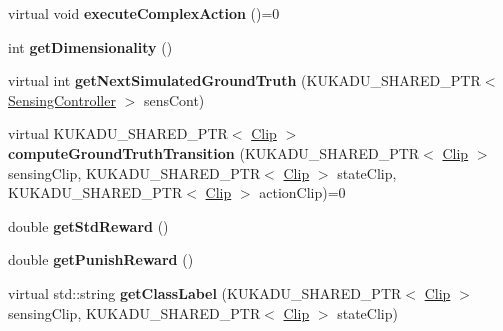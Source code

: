 \begin{DoxyCompactItemize}
\item 
\hypertarget{classkukadu_1_1ComplexController_a246a72860c5c317173d1f212ac7a25b3}{virtual void {\bfseries execute\-Complex\-Action} ()=0}\label{classkukadu_1_1ComplexController_a246a72860c5c317173d1f212ac7a25b3}

\item 
\hypertarget{classkukadu_1_1ComplexController_abc9b91acb5e94cbc6a4edd1ba3a38583}{int {\bfseries get\-Dimensionality} ()}\label{classkukadu_1_1ComplexController_abc9b91acb5e94cbc6a4edd1ba3a38583}

\item 
\hypertarget{classkukadu_1_1ComplexController_a1b272529d7f87ba1bfe9fde5e99f98de}{virtual int {\bfseries get\-Next\-Simulated\-Ground\-Truth} (K\-U\-K\-A\-D\-U\-\_\-\-S\-H\-A\-R\-E\-D\-\_\-\-P\-T\-R$<$ \hyperlink{classkukadu_1_1SensingController}{Sensing\-Controller} $>$ sens\-Cont)}\label{classkukadu_1_1ComplexController_a1b272529d7f87ba1bfe9fde5e99f98de}

\item 
\hypertarget{classkukadu_1_1ComplexController_a5b8c6fcde91e49e365ada1793f029170}{virtual K\-U\-K\-A\-D\-U\-\_\-\-S\-H\-A\-R\-E\-D\-\_\-\-P\-T\-R$<$ \hyperlink{classkukadu_1_1Clip}{Clip} $>$ {\bfseries compute\-Ground\-Truth\-Transition} (K\-U\-K\-A\-D\-U\-\_\-\-S\-H\-A\-R\-E\-D\-\_\-\-P\-T\-R$<$ \hyperlink{classkukadu_1_1Clip}{Clip} $>$ sensing\-Clip, K\-U\-K\-A\-D\-U\-\_\-\-S\-H\-A\-R\-E\-D\-\_\-\-P\-T\-R$<$ \hyperlink{classkukadu_1_1Clip}{Clip} $>$ state\-Clip, K\-U\-K\-A\-D\-U\-\_\-\-S\-H\-A\-R\-E\-D\-\_\-\-P\-T\-R$<$ \hyperlink{classkukadu_1_1Clip}{Clip} $>$ action\-Clip)=0}\label{classkukadu_1_1ComplexController_a5b8c6fcde91e49e365ada1793f029170}

\item 
\hypertarget{classkukadu_1_1ComplexController_af16017799bf3b952bcc97a5ea903b95d}{double {\bfseries get\-Std\-Reward} ()}\label{classkukadu_1_1ComplexController_af16017799bf3b952bcc97a5ea903b95d}

\item 
\hypertarget{classkukadu_1_1ComplexController_ae419d2cd6751f25c03b7b4bf44246bc7}{double {\bfseries get\-Punish\-Reward} ()}\label{classkukadu_1_1ComplexController_ae419d2cd6751f25c03b7b4bf44246bc7}

\item 
\hypertarget{classkukadu_1_1ComplexController_a9a581a10af011e183d4ae862a67951cf}{virtual std\-::string {\bfseries get\-Class\-Label} (K\-U\-K\-A\-D\-U\-\_\-\-S\-H\-A\-R\-E\-D\-\_\-\-P\-T\-R$<$ \hyperlink{classkukadu_1_1Clip}{Clip} $>$ sensing\-Clip, K\-U\-K\-A\-D\-U\-\_\-\-S\-H\-A\-R\-E\-D\-\_\-\-P\-T\-R$<$ \hyperlink{classkukadu_1_1Clip}{Clip} $>$ state\-Clip)}\label{classkukadu_1_1ComplexController_a9a581a10af011e183d4ae862a67951cf}


\end{DoxyCompactItemize}
